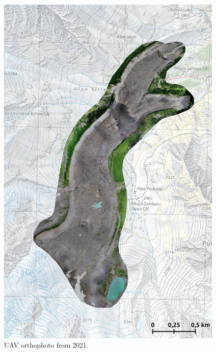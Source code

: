 \begin{figure}[p]
    \centering
    \includegraphics[height=\textheight]{figures/appendix/orto_2021.jpg}
    \caption[]{UAV orthophoto from 2021.}
\end{figure}

